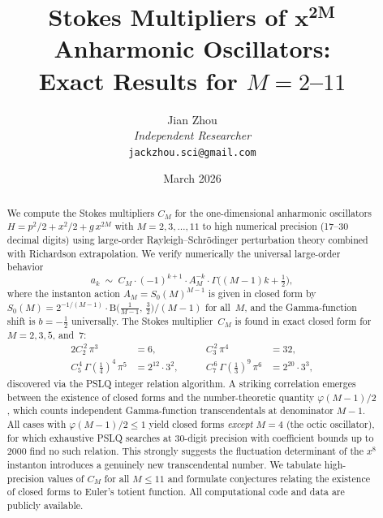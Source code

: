 \documentclass[12pt,a4paper]{article}
\numberwithin{equation}{section}
\theoremstyle{plain}
\theoremstyle{definition}
\theoremstyle{remark}
\newcommand{\BetaF}{\mathrm{B}}
\begin{document}
\title{\textbf{Stokes Multipliers of $\boldsymbol{x^{2M}}$ Anharmonic Oscillators:}\\[6pt]
\Large Exact Results for $M = 2$--$11$}
\author{Jian Zhou\\[4pt]
\textit{Independent Researcher}\\[2pt]
\texttt{jackzhou.sci@gmail.com}}
\date{March 2026}

\maketitle
\thispagestyle{fancy}

\begin{abstract}
We compute the Stokes multipliers $C_M$ for the one-dimensional anharmonic
oscillators $H = p^2/2 + x^2/2 + g\,x^{2M}$ with $M = 2, 3, \ldots, 11$
to high numerical precision (17--30 decimal digits) using large-order
Rayleigh--Schr\"odinger perturbation theory combined with Richardson
extrapolation. We verify numerically the universal large-order behavior
\[
  a_k \;\sim\; C_M \cdot (-1)^{k+1} \cdot A_M^{-k}
  \cdot \Gamma\!\bigl((M{-}1)k + \tfrac{1}{2}\bigr),
\]
where the instanton action $A_M = S_0(M)^{M-1}$ is given in closed form by
$S_0(M) = 2^{-1/(M-1)} \cdot \BetaF\!\bigl(\frac{1}{M-1},\,\frac{3}{2}\bigr)
\big/ (M{-}1)$
for all~$M$, and the Gamma-function shift is $b = -\frac{1}{2}$ universally.
The Stokes multiplier~$C_M$ is found in exact closed form for
$M = 2, 3, 5$, and~$7$:
\begin{alignat*}{2}
  C_2^{\,2}\,\pi^3 &= 6, &\qquad
  C_3^{\,2}\,\pi^4 &= 32, \\
  C_5^{\,4}\,\Gamma(\tfrac{1}{4})^4\,\pi^5 &= 2^{12}\cdot 3^2, &\qquad
  C_7^{\,6}\,\Gamma(\tfrac{1}{3})^9\,\pi^6 &= 2^{20}\cdot 3^3,
\end{alignat*}
discovered via the PSLQ integer relation algorithm.
A striking correlation emerges between the existence of closed forms and the
number-theoretic quantity $\varphi(M{-}1)/2$, which counts independent
Gamma-function transcendentals at denominator $M{-}1$.
All cases with $\varphi(M{-}1)/2 \le 1$ yield closed forms \emph{except}
$M = 4$ (the octic oscillator), for which exhaustive PSLQ searches at
30-digit precision with coefficient bounds up to 2000 find no such relation.
This strongly suggests the fluctuation determinant of the $x^8$ instanton
introduces a genuinely new transcendental number.
We tabulate high-precision values of $C_M$ for all $M \le 11$ and formulate
conjectures relating the existence of closed forms to Euler's totient function.
All computational code and data are publicly available.
\end{abstract}
\end{document}
